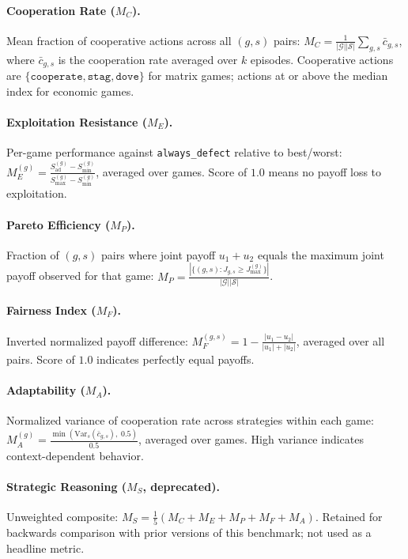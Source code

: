 \paragraph{Cooperation Rate ($M_C$).}
Mean fraction of cooperative actions across all $(g, s)$ pairs:
$M_C = \frac{1}{|\mathcal{G}||\mathcal{S}|} \sum_{g,s} \bar{c}_{g,s}$,
where $\bar{c}_{g,s}$ is the cooperation rate averaged over $k$ episodes.
Cooperative actions are $\{\texttt{cooperate}, \texttt{stag}, \texttt{dove}\}$
for matrix games; actions at or above the median index for economic games.

\paragraph{Exploitation Resistance ($M_E$).}
Per-game performance against \texttt{always\_defect} relative to
best/worst:
$M_E^{(g)} = \frac{S_{\text{ad}}^{(g)} - S_{\min}^{(g)}}{S_{\max}^{(g)} - S_{\min}^{(g)}}$,
averaged over games. Score of $1.0$ means no payoff loss to exploitation.

\paragraph{Pareto Efficiency ($M_P$).}
Fraction of $(g,s)$ pairs where joint payoff $u_1 + u_2$ equals the
maximum joint payoff observed for that game:
$M_P = \frac{|\{(g,s) : J_{g,s} \geq J_{\max}^{(g)}\}|}{|\mathcal{G}||\mathcal{S}|}$.

\paragraph{Fairness Index ($M_F$).}
Inverted normalized payoff difference:
$M_F^{(g,s)} = 1 - \frac{|u_1 - u_2|}{|u_1| + |u_2|}$, averaged over
all pairs. Score of $1.0$ indicates perfectly equal payoffs.

\paragraph{Adaptability ($M_A$).}
Normalized variance of cooperation rate across strategies within each game:
$M_A^{(g)} = \frac{\min(\text{Var}_s(\bar{c}_{g,s}),\; 0.5)}{0.5}$,
averaged over games. High variance indicates context-dependent behavior.

\paragraph{Strategic Reasoning ($M_S$, deprecated).}
Unweighted composite: $M_S = \frac{1}{5}(M_C + M_E + M_P + M_F + M_A)$.
Retained for backwards comparison with prior versions of this benchmark;
not used as a headline metric.

